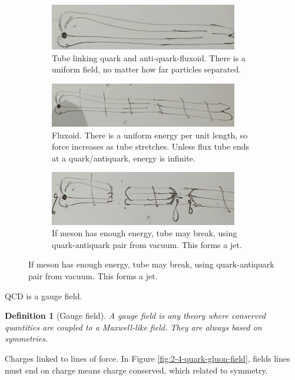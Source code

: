 \documentclass[]{article}
\newtheorem{defn}[thm]{Definition}
\begin{document}
\begin{figure}[H]
\begin{subfigure}{0.45\textwidth}
		\caption{Tube linking quark and anti-quark-fluxoid. There is a uniform field, no matter how far particles separated.}
		\includegraphics[width=0.9\textwidth]{2-4-quark-gluon-field-tubes-QAQ}
	\end{subfigure}
	\begin{subfigure}{0.45\textwidth}
		\caption{Fluxoid. There is a uniform energy per unit length, so force increases as tube stretches. Unless flux tube ends at a quark/antiquark, energy is infinite.}
		\includegraphics[width=0.9\textwidth]{2-4-quark-gluon-field-tube-uniform-energy}
	\end{subfigure}
	\begin{subfigure}{0.45\textwidth}
		\caption{If meson has enough energy, tube may break, using quark-antiquark pair from vacuum. This forms a jet.}
		\includegraphics[width=0.9\textwidth]{2-4-split-meson}
	\end{subfigure}
\end{figure}

QCD is a gauge field.

\begin{defn}[Gauge field]
	A gauge field is any theory where conserved quantities are coupled to a Maxwell-like field. They are always based on symmetries.
\end{defn}

Charges linked to lines of force. In Figure \ref{fig:2-4-quark-gluon-field}, fields lines must end on charge means charge conserved, which related to symmetry.
\end{document}
